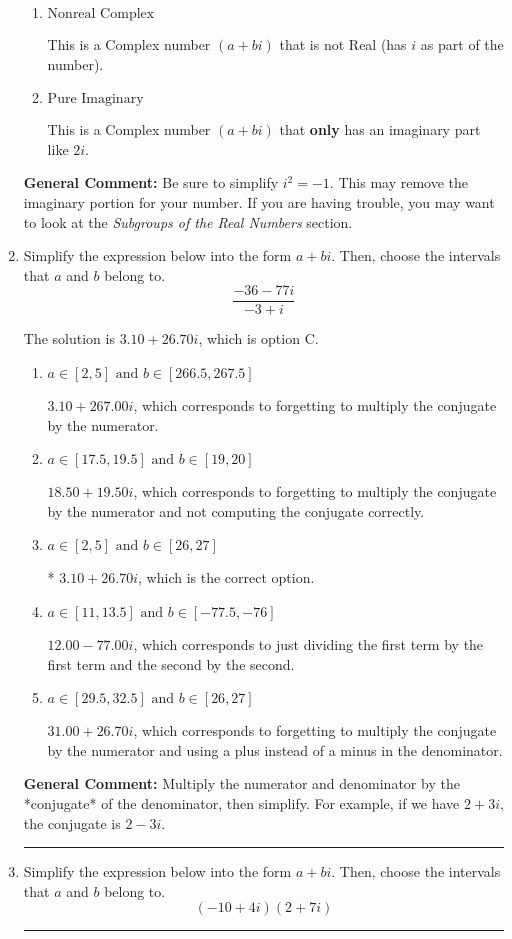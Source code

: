 \documentclass{extbook}[14pt]
\newcommand{\litem}[1]{\item #1

\rule{\textwidth}{0.4pt}}
\begin{document}
\begin{enumerate}
{\begin{enumerate}[label=\Alph*.]
* This is the correct option!
\item \( \text{Nonreal Complex} \)

This is a Complex number $(a+bi)$ that is not Real (has $i$ as part of the number).
\item \( \text{Pure Imaginary} \)

This is a Complex number $(a+bi)$ that \textbf{only} has an imaginary part like $2i$.
\end{enumerate}

\textbf{General Comment:} Be sure to simplify $i^2 = -1$. This may remove the imaginary portion for your number. If you are having trouble, you may want to look at the \textit{Subgroups of the Real Numbers} section.
}
\litem{
Simplify the expression below into the form $a+bi$. Then, choose the intervals that $a$ and $b$ belong to.
\[ \frac{-36 - 77 i}{-3 + i} \]

The solution is \( 3.10  + 26.70 i \), which is option C.\begin{enumerate}[label=\Alph*.]
\item \( a \in [2, 5] \text{ and } b \in [266.5, 267.5] \)

 $3.10  + 267.00 i$, which corresponds to forgetting to multiply the conjugate by the numerator.
\item \( a \in [17.5, 19.5] \text{ and } b \in [19, 20] \)

 $18.50  + 19.50 i$, which corresponds to forgetting to multiply the conjugate by the numerator and not computing the conjugate correctly.
\item \( a \in [2, 5] \text{ and } b \in [26, 27] \)

* $3.10  + 26.70 i$, which is the correct option.
\item \( a \in [11, 13.5] \text{ and } b \in [-77.5, -76] \)

 $12.00  - 77.00 i$, which corresponds to just dividing the first term by the first term and the second by the second.
\item \( a \in [29.5, 32.5] \text{ and } b \in [26, 27] \)

 $31.00  + 26.70 i$, which corresponds to forgetting to multiply the conjugate by the numerator and using a plus instead of a minus in the denominator.
\end{enumerate}

\textbf{General Comment:} Multiply the numerator and denominator by the *conjugate* of the denominator, then simplify. For example, if we have $2+3i$, the conjugate is $2-3i$.
}
\litem{
Simplify the expression below into the form $a+bi$. Then, choose the intervals that $a$ and $b$ belong to.
\[ (-10 + 4 i)(2 + 7 i) \]

}
\end{enumerate}
\end{document}
